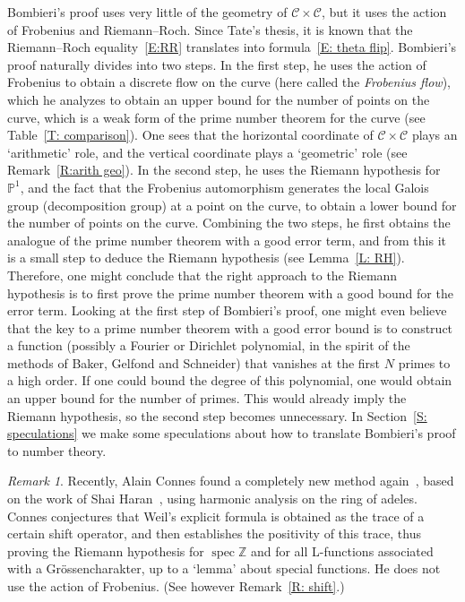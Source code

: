 \documentclass{amsart}
\newcommand\Z{\mathbb{Z}}	\newcommand\C{\mathbb{C}}
\newcommand\spec{\operatorname{spec}}
\renewcommand\P{\mathbb{P}}
\newcommand\Curve{\mathcal{C}}
\theoremstyle{definition}\newtheorem{definition}[theorem]{Definition}
\theoremstyle{remark}\newtheorem{remark}[theorem]{Remark}
\numberwithin{equation}{section}
\begin{document}
Bombieri's proof uses very little of the geometry of $\Curve\times\Curve$,
 but it uses the action of Frobenius and Riemann--Roch.
Since Tate's thesis,
it is known that the Riemann--Roch equality~\eqref{E:RR} translates into formula~\eqref{E: theta flip}.
Bombieri's proof naturally divides into two steps.
In the first step,
he uses the action of Frobenius to obtain a discrete flow on the curve (here called the {\em Frobenius flow\/}),
which he analyzes to obtain an upper bound for the number of points on the curve,
which is a weak form of the prime number theorem for the curve (see Table~\ref{T: comparison}).
One sees that the horizontal coordinate of $\Curve\times\Curve$ plays an `arithmetic' role,
and the vertical coordinate plays a `geometric' role (see Remark~\ref{R:arith geo}).
In the second step,
he uses the Riemann hypothesis for~$\P^1$,
and the fact that the Frobenius automorphism generates the local Galois group (decomposition group) at a point on the curve,
to obtain a lower bound for the number of points on the curve.
Combining the two steps,
he first obtains the analogue of the prime number theorem with a good error term,
and from this it is a small step to deduce the Riemann hypothesis (see Lemma~\ref{L: RH}).
Therefore,
one might conclude that the right approach to the Riemann hypothesis is to first prove the prime number theorem with a good bound for the error term.
Looking at the first step of Bombieri's proof,
one might even believe that the key to a prime number theorem with a good error bound is to construct a function (possibly a Fourier or Dirichlet polynomial,
in the spirit of the methods of Baker,
Gelfond and Schneider) that vanishes at the first $N$ primes to a high order.
If one could bound the degree of this polynomial,
 one would obtain an upper bound for the number of primes.
This would already imply the Riemann hypothesis,
so the second step becomes unnecessary.
In Section~\ref{S: speculations} we make some speculations about how to translate Bombieri's proof to number theory.

\begin{remark}
Recently,
Alain Connes found a completely new method again~\cite{Connes},
based on the work of Shai Haran~\cite{Haran,mystery},
using harmonic analysis on the ring of adeles.
Connes conjectures that Weil's explicit formula is obtained as the trace of a certain shift operator,
and then establishes the positivity of this trace,
thus proving the Riemann hypothesis for $\spec\Z$ and for all L-functions associated with a Gr\"ossencharakter,
up to a `lemma' about special functions.
He does not use the action of Frobenius.
(See however Remark~\ref{R: shift}.)
\end{remark}
\end{document}
